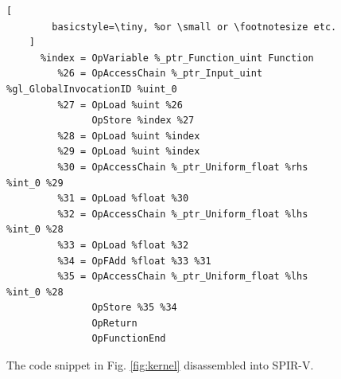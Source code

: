 \documentclass{report}
\begin{document}
\begin{figure}
\begin{lstlisting}[
        basicstyle=\tiny, %or \small or \footnotesize etc.
    ]
      %index = OpVariable %_ptr_Function_uint Function
         %26 = OpAccessChain %_ptr_Input_uint %gl_GlobalInvocationID %uint_0
         %27 = OpLoad %uint %26
               OpStore %index %27
         %28 = OpLoad %uint %index
         %29 = OpLoad %uint %index
         %30 = OpAccessChain %_ptr_Uniform_float %rhs %int_0 %29
         %31 = OpLoad %float %30
         %32 = OpAccessChain %_ptr_Uniform_float %lhs %int_0 %28
         %33 = OpLoad %float %32
         %34 = OpFAdd %float %33 %31
         %35 = OpAccessChain %_ptr_Uniform_float %lhs %int_0 %28
               OpStore %35 %34
               OpReturn
               OpFunctionEnd
    \end{lstlisting}
    \caption{The code snippet in Fig. \ref{fig:kernel} disassembled into SPIR-V.}
    \label{fig:addition}
\end{figure}

{
\renewcommand*{\bibfont}{\small}
\printbibliography
}
\end{document}
